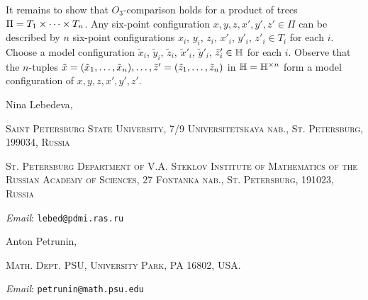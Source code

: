 \documentclass{article}
\makeatletter
\newcommand{\Addresses}{{\bigskip\footnotesize

\noindent Nina Lebedeva,
\par\nopagebreak
 \textsc{Saint Petersburg State University, 7/9 Universitetskaya nab., St. Petersburg, 199034, Russia}
\par
\nopagebreak
 \textsc{St. Petersburg Department of V.A. Steklov Institute of Mathematics of the Russian Academy of Sciences, 27 Fontanka nab., St. Petersburg, 191023, Russia}
  \par\nopagebreak
  \textit{Email}: \texttt{lebed@pdmi.ras.ru}

\medskip

\noindent   Anton Petrunin, 
\par\nopagebreak
 \textsc{Math. Dept. PSU, University Park, PA 16802, USA.}
  \par\nopagebreak
  \textit{Email}: \texttt{petrunin@math.psu.edu}
  
}}
\makeatother
\begin{document}
It remains to show that $O_3$-comparison holds for a product of trees $\Pi\z=T_1\times \dots\times T_n$.
Any six-point configuration $x,y,z,x',y',z'\in \Pi$ can be described by $n$ six-point configurations $x_i$, $y_i$, $z_i$, $x'_i$, $y'_i$, $z'_i\in T_i$ for each $i$.
Choose a model configuration $\tilde x_i$, $\tilde y_i$, $\tilde z_i$, $\tilde x'_i$, $\tilde y'_i$, $\tilde z'_i\in \mathbb H$ for each $i$.
Observe that the $n$-tuples $\tilde x=(\tilde x_1,\dots, \tilde x_n),\z\dots,\tilde z'=(\tilde z_1,\dots, \tilde z_n)$ in $\mathbb H=\mathbb H^{\times n}$ form a model configuration of $x,y,z,x',y',z'$.
\qeds



{\sloppy
\printbibliography[heading=bibintoc]
\fussy
}

\Addresses
\end{document}
